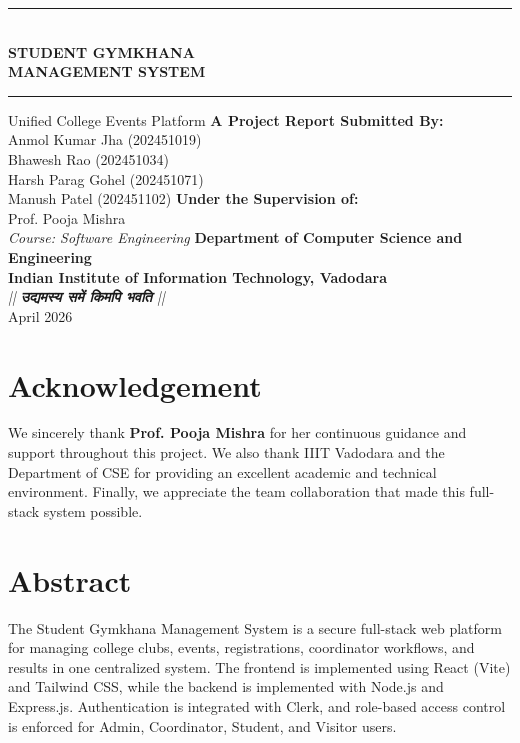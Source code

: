 \documentclass[12pt, a4paper]{article}
\begin{document}
\begin{titlepage}
    \centering
    \vspace*{1.5cm}
    \rule{\textwidth}{1pt}\\[0.4cm]
    {\Huge \textbf{STUDENT GYMKHANA\\[0.5cm] MANAGEMENT SYSTEM}}\\[0.4cm]
    \rule{\textwidth}{1pt}
    \vspace{0.8cm}
    {\LARGE Unified College Events Platform}
    \vspace{2.5cm}
    {\Large \textbf{A Project Report Submitted By:}}\\
    {\large Anmol Kumar Jha (202451019)}\\
    {\large Bhawesh Rao (202451034)}\\
    {\large Harsh Parag Gohel (202451071)}\\
    {\large Manush Patel (202451102)}
    \vspace{1.5cm}
    {\Large \textbf{Under the Supervision of:}}\\
    {\large Prof. Pooja Mishra}\\
    \vspace{0.2cm}
    {\large \textit{Course: Software Engineering}}
    \vfill
    {\Large \textbf{Department of Computer Science and Engineering}}\\
    {\Large \textbf{Indian Institute of Information Technology, Vadodara}}\\
    \vspace{0.8cm}
    {\large \textit{|| \textbf{उद्यमस्य समें किमपि भवति} ||}}\\
    \vspace{0.8cm}
    {\large April 2026}
\end{titlepage}

\newpage
\section*{Acknowledgement}
We sincerely thank \textbf{Prof. Pooja Mishra} for her continuous guidance and support throughout this project. We also thank IIIT Vadodara and the Department of CSE for providing an excellent academic and technical environment. Finally, we appreciate the team collaboration that made this full-stack system possible.

\newpage
\section*{Abstract}
The Student Gymkhana Management System is a secure full-stack web platform for managing college clubs, events, registrations, coordinator workflows, and results in one centralized system. The frontend is implemented using React (Vite) and Tailwind CSS, while the backend is implemented with Node.js and Express.js. Authentication is integrated with Clerk, and role-based access control is enforced for Admin, Coordinator, Student, and Visitor users.
\end{document}
